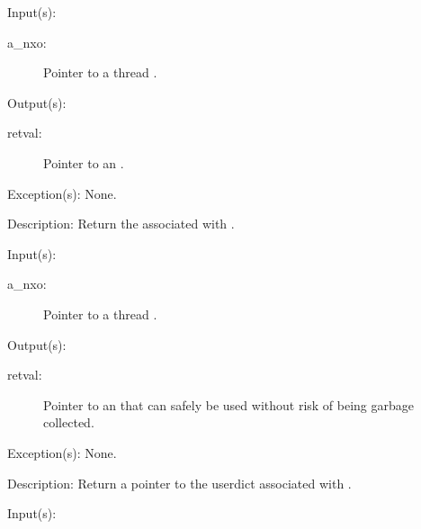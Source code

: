 \begin{capi}
\label{nxo_thread_nx_get}
	\begin{capilist}
	\item[Input(s): ]
		\begin{description}\item[]
		\item[a\_nxo: ]
			Pointer to a thread .
		\end{description}
	\item[Output(s): ]
		\begin{description}\item[]
		\item[retval: ]
			Pointer to an .
		\end{description}
	\item[Exception(s): ] None.
	\item[Description: ]
		Return the  associated with .
	\end{capilist}
\label{nxo_thread_userdict_get}
	\begin{capilist}
	\item[Input(s): ]
		\begin{description}\item[]
		\item[a\_nxo: ]
			Pointer to a thread \classname{nxo}.
		\end{description}
	\item[Output(s): ]
		\begin{description}\item[]
		\item[retval: ]
			Pointer to an  that can safely be used
			without risk of being garbage collected.
		\end{description}
	\item[Exception(s): ] None.
	\item[Description: ]
		Return a pointer to the userdict associated with \cvar{a\_nxo}.
	\end{capilist}
\label{nxo_thread_errordict_get}
	\begin{capilist}
	\item[Input(s): ]

\end{capilist}
\end{capi}
